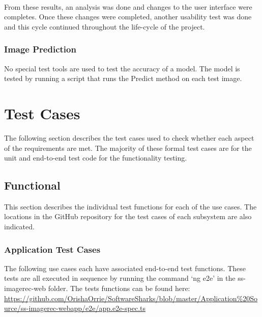 \documentclass[a4paper, 11pt]{article}
\begin{document}
            \paragraph{}
            From these results, an analysis was done and changes to the user interface were completes. Once these changes were completed, another usability test was done and this cycle continued throughout the life-cycle of the project.
            
        \subsubsection{Image Prediction}
            No special test tools are used to test the accuracy of a model. The model is tested by running a script that runs the Predict method on each test image.

\pagebreak
\section{Test Cases}
The following section describes the test cases used to check whether each aspect of the requirements are met. The majority of these formal test cases are for the unit and end-to-end test code for the functionality testing.
    
    \subsection{Functional}
    This section describes the individual test functions for each of the use cases. The locations in the GitHub repository for the test cases of each subsystem are also indicated.

        \subsubsection{Application Test Cases}
        The following use cases each have associated end-to-end test functions. These tests are all executed in sequence by running the command ‘ng e2e’ in the ss-imagerec-web folder. The tests functions can be found here:\\
        \url{https://github.com/OrishaOrrie/SoftwareSharks/blob/master/Application\%20Source/ss-imagerec-webapp/e2e/app.e2e-spec.ts}
        
\end{document}
